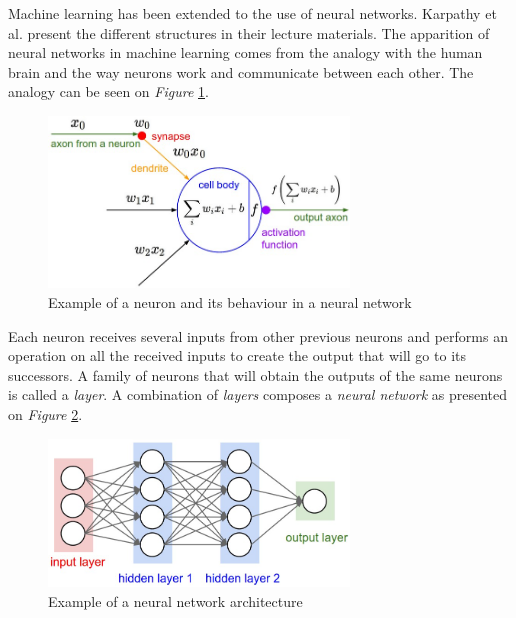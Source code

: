  Machine learning has been extended to the use of neural networks. Karpathy et al. \cite{Karpathy2015} present the different structures in their lecture materials. The apparition of neural networks in machine learning comes from the analogy with the human brain and the way neurons work and communicate between each other. The analogy can be seen on \emph{Figure} \ref{fig:Neuron}.

\begin{figure}[htbp]
	\centering
		\includegraphics[width=8cm]{Figures/Neuron.png}
	\caption[Neuron Example]{Example of a neuron and its behaviour in a neural network \cite{Karpathy2015}}
	\label{fig:Neuron}
\end{figure}

Each neuron receives several inputs from other previous neurons and performs an operation on all the received inputs to create the output that will go to its successors. A family of neurons that will obtain the outputs of the same neurons is called a \emph{layer}. A combination of \emph{layers} composes a \emph{neural network} as presented on \emph{Figure} \ref{fig:NN}.

\begin{figure}[htbp]
	\centering
		\includegraphics[width=8cm]{Figures/NN.png}
	\caption[Neural Network Example]{Example of a neural network architecture \cite{Karpathy2015}}
	\label{fig:NN}
\end{figure}

